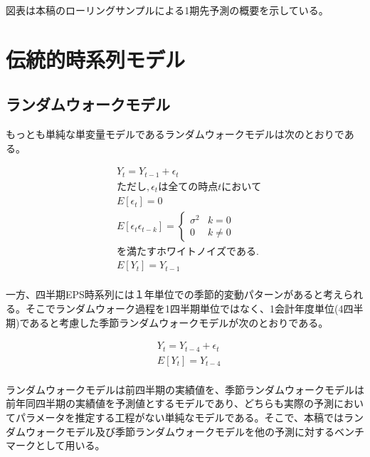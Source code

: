 \documentclass[a4paper, 12pt]{jsreport}
\begin{document}
図表は本稿のローリングサンプルによる1期先予測の概要を示している。


\section{伝統的時系列モデル}

\subsection{ランダムウォークモデル}

もっとも単純な単変量モデルであるランダムウォークモデルは次のとおりである。

\begin{equation}
  \begin{split}
    & Y_t = Y_{t-1} + \epsilon_t \\
    & ただし, \epsilon_t は全ての時点 t において \\
    & E[\epsilon_t] = 0 \\
    & E[\epsilon_t \epsilon_{t-k}] = \left\{
        \begin{array}{ll}
        \sigma^2 & k=0 \\
        0 & k \neq 0
\end{array}\right. \\
    & を満たすホワイトノイズである. \\
    & E[Y_t] = Y_{t-1} \\
\end{split}
\end{equation}    

一方、四半期EPS時系列には１年単位での季節的変動パターンがあると考えられる。そこでランダムウォーク過程を1四半期単位ではなく、1会計年度単位(4四半期)であると考慮した季節ランダムウォークモデルが次のとおりである。

\begin{equation}
  \begin{split}
    & Y_t = Y_{t-4} + \epsilon_t \\
    & E[Y_t] = Y_{t-4} \\
  \end{split}
\end{equation} 

ランダムウォークモデルは前四半期の実績値を、季節ランダムウォークモデルは前年同四半期の実績値を予測値とするモデルであり、どちらも実際の予測においてパラメータを推定する工程がない単純なモデルである。そこで、本稿ではランダムウォークモデル及び季節ランダムウォークモデルを他の予測に対するベンチマークとして用いる。
\end{document}
